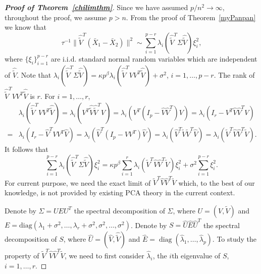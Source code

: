 \documentclass[review]{elsarticle}
\DeclareMathOperator{\mydiag}{diag}
\theoremstyle{plain}
\theoremstyle{definition}
\theoremstyle{remark}
\begin{document}
\begin{proof}[\textbf{Proof of Theorem~\ref{chilimthm}}]
    Since we have assumed $p/n^2\to \infty$, throughout the proof, we assume $p>n$.
    From the proof of Theorem~\ref{myPanpan} we know that 
\begin{equation*}
    \tau^{-1}\big\|\hat{\tilde{V}}^T(\bar{X}_1-\bar{X}_2)\big\|^2
\sim
    \sum_{i=1}^{p-r} \lambda_i(\hat{\tilde{V}}^T\Sigma\hat{\tilde{V}})\xi_i^2,
\end{equation*}
where $\{\xi_i\}_{i=1}^{p-r}$ are i.i.d. standard normal random variables which are independent of $\hat{\tilde{V}}$.
Note that
$\lambda_i(\hat{\tilde{V}}^T\Sigma\hat{\tilde{V}})
   = 
    \kappa p^{\beta}\lambda_i(\hat{\tilde{V}}^TVV^T\hat{\tilde{V}})+\sigma^2
    $, $i=1,\ldots, p-r$.
    The rank of $\hat{\tilde{V}}^TVV^T\hat{\tilde{V}}$ is $r$. For $i=1,\ldots, r$,
    \begin{equation*}
        \begin{aligned}
            &\lambda_i(\hat{\tilde{V}}^TVV^T\hat{\tilde{V}})=
    \lambda_i(V^T\hat{\tilde{V}}\hat{\tilde{V}}^TV)=
            \lambda_i(V^T(I_p-\hat{V}\hat{V}^T)V)=
            \lambda_i(I_r-V^T\hat{V}\hat{V}^T V)\\
            =&
            \lambda_i(I_r-\hat{V}^T VV^T\hat{V})=
            \lambda_i(\hat{V}^T(I_p- VV^T)\hat{V})=
            \lambda_i(\hat{V}^T \tilde{V}\tilde{V}^T\hat{V})=
            \lambda_i(\tilde{V}^T\hat{V}\hat{V}^T \tilde{V}).
        \end{aligned}
    \end{equation*}
    It follows that
    \begin{equation}\label{aimafenjie}
    \sum_{i=1}^{p-r} \lambda_i(\hat{\tilde{V}}^T\Sigma\hat{\tilde{V}})\xi_i^2
=
    \kappa p^{\beta}\sum_{i=1}^r \lambda_i(\tilde{V}^T\hat{V}\hat{V}^T\tilde{V})\xi_i^2+
    \sigma^2\sum_{i=1}^{p-r}\xi_i^2.
\end{equation}
For current purpose, we need the exact limit of $\tilde{V}^T\hat{V}\hat{V}^T\tilde{V}$ which, to the best of our knowledge,
is not provided by existing PCA theory in the current context.

Denote by $\Sigma=UEU^T$ the spectral decomposition of $\Sigma$, where $U=(V,\tilde{V})$ and $E=\mathrm{diag}(\lambda_1+\sigma^2,\ldots,\lambda_r+\sigma^2,\sigma^2,\ldots,\sigma^2)$.
    Denote by $S=\hat{U}\hat{E}\hat{U}^T$ the spectral decomposition of $S$, where $\hat{U}=(\hat{V},\hat{\tilde{V}})$ and $\hat{E}=\mydiag(\hat{\lambda}_1,\ldots,\hat{\lambda}_p)$.
    To study the property of $\tilde{V}^T\hat{V}\hat{V}^T\tilde{V}$, we need to first consider $\hat{\lambda}_i$, the $i$th eigenvalue of $S$, $i=1,\ldots, r$.


\end{proof}
\end{document}
